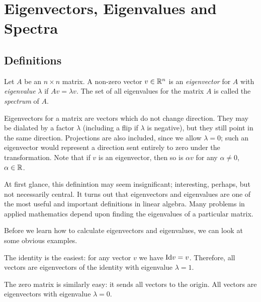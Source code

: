 \documentclass[fleqn]{report}
\begin{document}
\chapter{Eigenvectors, Eigenvalues and Spectra}
\label{eigenvectors}

\section{Definitions}

\begin{defn}
Let $A$ be an $n \times n$ matrix. A non-zero vector $v \in
\mathbb{R}^n$ is an \emph{eigenvector} for $A$ with \emph{eigenvalue}
$\lambda$ if $Av = \lambda v$. The set of all eigenvalues for
the matrix $A$ is called the \emph{spectrum} of $A$.
\end{defn}

Eigenvectors for a matrix are vectors which do not change
direction. They may be dialated by a factor $\lambda$
(including a flip if $\lambda$ is negative), but they still
point in the same direction. Projections are also included,
since we allow $\lambda = 0$; such an eigenvector would
represent a direction sent entirely to zero under the
transformation. Note that if $v$ is an eigenvector, then so
is $\alpha v$ for any $\alpha \neq 0$, $\alpha \in \mathbb{R}$. 

At first glance, this definintion may seem insignificant;
interesting, perhaps, but not necessarily central. It turns
out that eigenvectors and eigenvalues are one of the most
useful and important definitions in linear algebra. Many
problems in applied mathematics depend upon finding the
eigenvalues of a particular matrix.

Before we learn how to calculate eigenvectors
and eigenvalues, we can look at some obvious examples. 

\begin{example}
The identity is the easiest: for any vector $v$ we have $\mathrm{Id} v =
v$. Therefore, all vectors are eigenvectors of the identity
with eigenvalue $\lambda = 1$. 
\end{example}

\begin{example}
The zero matrix is similarly easy: it sends all vectors to the
origin. All vectors are eigenvectors with eigenvalue $\lambda = 0$.
\end{example}
\end{document}
